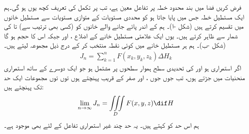 فرض کریں فضا میں بند محدود   خطہ   پر تفاعل  معین ہے، تب  پر تکمل   کی تعریف کچھ یوں ہو گی۔ہم ایک مستطیل خطہ  جس میں  پایا جاتا ہو کو محددی مستویات کے متوازی  مستویات  سے مستطیل خانوں میں تقسیم کرتے ہیں (شکل -ا)۔ ہم  کے اندر پائے جانے والے  خانوں کو  (کسی بھی ترتیب سے)  تا  کی  شمار سے ظاہر  کرتے ہیں۔   یوں ایک علامتی مستطیل خانے کے اضلاع ،  اور  جبکہ اس کا حجم  ہو گا (شکل -ب)۔ ہم ہر مستطیل خانے میں کوئی نقطہ  منتخب کر کے درج ذیل مجموعہ  لیتے  ہیں۔
\begin{align}\label{مساوات_بالکثرت_تہرا_مجموعہ_الف}
J_n=\sum_{k=1}^{n} F(x_k,y_k,z_k)\Delta H_k
\end{align}
اگر  استمراری ہو اور  کی تحدیدی سطح ہموار سطحوں پر مشتمل ہو جو ایک دوسرے کے ساتھ استمراری منحنیات میں جڑتے ہوں، تب جوں جوں ،  اور  صفر کے قریب پہنچتے ہوں  توں توں  مجموعات    ایک حد تک پہنچتے ہیں:
\begin{align}
\lim_{n\to \infty}J_n=\iiint\limits_D F(x,y,z)\dif H
\end{align} 
ہم اس حد کو کہتے ہیں۔ یہ حد چند غیر استمراری تفاعل کے لئے بھی موجود ہے۔
